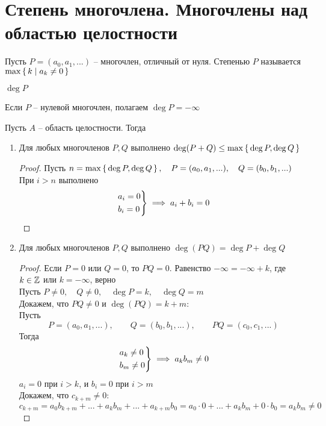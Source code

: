 \section{Степень многочлена. Многочлены над областью целостности}

\begin{definition}
	Пусть $P = (a_0, a_1, ...)$ -- многочлен, отличный от нуля. Степенью $P$ называется $\max \set{k | a_k \ne 0}$
	\begin{notation}
		$ \deg P$
	\end{notation}
	Если $P$ -- нулевой многочлен, полагаем $\deg P = -\infty$
\end{definition}

\begin{theorem}
	Пусть $A$ -- область целостности. Тогда
	\begin{enumerate}
		\item Для любых многочленов $P, Q$ выполнено $\deg (P + Q) \le \max \set{\deg P, \deg Q}$
		\begin{proof}
			Пусть $n = \max \set{\deg P, \deg Q}, \quad P = (a_0, a_1, ...), \quad Q = (b_0, b_1, ...)$ \\
			При $i > n$ выполнено
			$$ \begin{rcases}
			   	a_i = 0 \\
				b_i = 0
			   \end{rcases} \implies a_i + b_i = 0 $$
		\end{proof}
		\item Для любых многочленов $P, Q$ выполнено $\deg(PQ) = \deg P + \deg Q$
		\begin{proof}
			Если $P = 0$ или $Q = 0$, то $PQ = 0$. Равенство $-\infty = -\infty + k$, где $k \in \mathbb{Z}$ или $ k = -\infty$, верно \\
			Пусть $P \ne 0, \quad Q \ne 0, \quad \deg P = k, \quad \deg Q = m$ \\
			Докажем, что $PQ \ne 0$ и $\deg(PQ) = k + m$: \\
			Пусть
			$$ P = (a_0, a_1, ...), \qquad Q = (b_0, b_1, ...), \qquad PQ = (c_0, c_1, ...) $$
			Тогда
			$$ \begin{rcases}
			   	a_k \ne 0 \\
				b_m \ne 0
			   \end{rcases} \implies a_kb_m \ne 0 $$
			$a_i = 0$ при $i > k$, и $b_i = 0$ при $i > m$ \\
			Докажем, что $c_{k + m} \ne 0$:
			$$ c_{k + m} = a_0b_{k + m} + ... + a_kb_m + ... + a_{k + m}b_0 = a_0 \cdot 0 + ... + a_kb_m + 0 \cdot b_0 = a_kb_m \ne 0 $$

\end{proof}
\end{enumerate}
\end{theorem}
